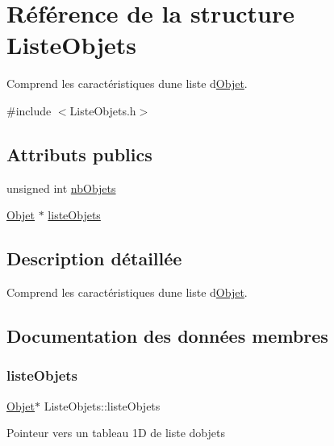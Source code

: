 \hypertarget{structListeObjets}{}\section{Référence de la structure Liste\+Objets}
\label{structListeObjets}


Comprend les caractéristiques d\textquotesingle{}une liste d\textquotesingle{}\mbox{\hyperlink{structObjet}{Objet}}.  




{\ttfamily \#include $<$Liste\+Objets.\+h$>$}

\subsection*{Attributs publics}
\begin{DoxyCompactItemize}
\item 
unsigned int \mbox{\hyperlink{structListeObjets_af4c85a8aaea301d98f395e4f26e93cb0}{nb\+Objets}}
\item 
\mbox{\hyperlink{structObjet}{Objet}} $\ast$ \mbox{\hyperlink{structListeObjets_abb023142003f84265b55ee66de08d05e}{liste\+Objets}}
\end{DoxyCompactItemize}


\subsection{Description détaillée}
Comprend les caractéristiques d\textquotesingle{}une liste d\textquotesingle{}\mbox{\hyperlink{structObjet}{Objet}}. 

\subsection{Documentation des données membres}
\mbox{\label{structListeObjets_abb023142003f84265b55ee66de08d05e}} 
\subsubsection{\texorpdfstring{liste\+Objets}{listeObjets}}
{\footnotesize\ttfamily \mbox{\hyperlink{structObjet}{Objet}}$\ast$ Liste\+Objets\+::liste\+Objets}

Pointeur vers un tableau 1D de liste d\textquotesingle{}objets \mbox{\label{structListeObjets_af4c85a8aaea301d98f395e4f26e93cb0}} 
